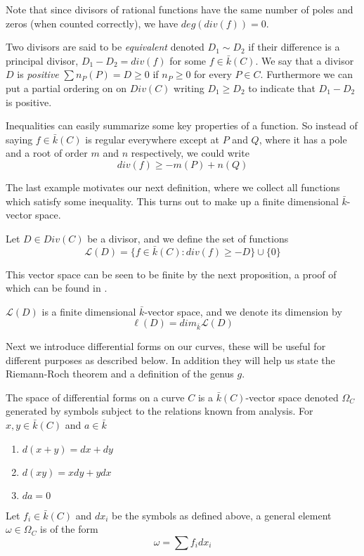 Note that since divisors of rational functions have the same number of poles
and zeros (when counted correctly), we have $deg(div(f)) = 0$.

Two divisors are said to be \emph{equivalent} denoted $D_1 \sim D_2$ if
their difference is a principal divisor, $D_1 - D_2 = div(f)$ for some $f\in \bar{k}(C)$.
We say that a divisor $D$ is
\emph{positive} $\sum n_P(P)=D \geq 0$ if $n_P \geq 0$ for every $P\in C$. Furthermore
we can put a partial ordering on on $Div(C)$ writing $D_1 \geq D_2$ to indicate that $D_1 - D_2$ is positive.

\begin{ex}
 Inequalities can easily summarize some key properties of a function. So instead of
saying $f \in \bar{k}(C)$ is regular everywhere except at $P$ and $Q$, where it has a
pole and a root of order $m$ and $n$ respectively, we could write
$$ div(f) \geq -m(P)+n(Q) $$
\end{ex}

The last example motivates our next definition, where we collect all functions
which satisfy some inequality. This turns out to make up a finite dimensional
$\bar{k}$-vector space.

\begin{mydef}
 Let $D \in Div(C)$ be a divisor, and we define the set of functions
$$ \mathscr{L}(D) = \{ f\in \bar{k}(C) : div(f) \geq -D \} \cup \{ 0\} $$
\end{mydef}

This vector space can be seen to be finite by the next proposition, a proof of
which can be found in \cite{Fulton}.

\begin{prop}
 $\mathscr{L}(D)$ is a finite dimensional $\bar{k}$-vector space, and we denote
its dimension by
$$ \ell(D) = dim_{\bar{k}} \mathscr{L}(D) $$
\end{prop}

Next we introduce differential forms on our curves, these will be useful for different purposes
as described below. In addition they will help us state the Riemann-Roch theorem and a definition
of the genus $g$.

\begin{mydef}
 The space of differential forms on a curve $C$ is a $\bar{k}(C)$-vector space denoted $\Omega_C$
generated by symbols subject to the relations known from analysis. 
For $x, y \in \bar{k}(C)$ and $a \in \bar{k}$
\begin{enumerate}
  \item $d(x+y) = dx + dy$
  \item $d(xy) = xdy + ydx$
  \item $da = 0$
\end{enumerate}
Let $f_i \in \bar{k}(C)$ and $dx_i$ be the symbols as defined above, a general
element $\omega \in \Omega_C$ is of the form
$$ \omega = \sum f_i dx_i $$
\end{mydef}

